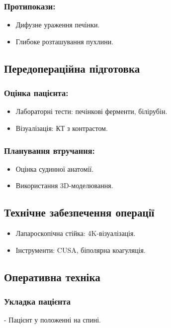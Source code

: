 \begin{refsection}
\subsubsection{Протипокази:}
\begin{itemize}
    \item Дифузне ураження печінки.
    \item Глибоке розташування пухлини.
\end{itemize}

\subsection{Передопераційна підготовка}
\subsubsection{Оцінка пацієнта:}
\begin{itemize}
    \item Лабораторні тести: печінкові ферменти, білірубін.
    \item Візуалізація: КТ з контрастом.
\end{itemize}

\subsubsection{Планування втручання:}
\begin{itemize}
    \item Оцінка судинної анатомії.
    \item Використання 3D-моделювання.
\end{itemize}

\subsection{Технічне забезпечення операції}
\begin{itemize}
    \item Лапароскопічна стійка: 4K-візуалізація.
    \item Інструменти: CUSA, біполярна коагуляція.
\end{itemize}

\subsection{Оперативна техніка}
\subsubsection{Укладка пацієнта}
- Пацієнт у положенні на спині.


\end{refsection}
